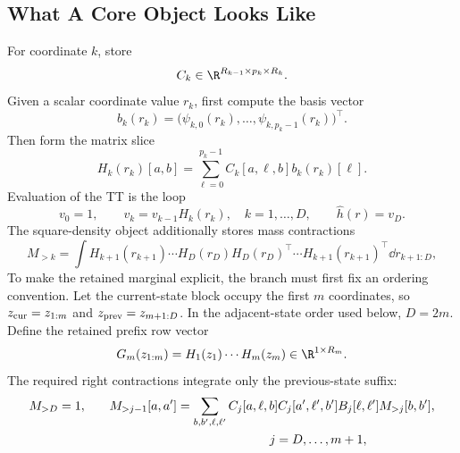 \subsection{What A Core Object Looks Like}
\label{sec:bf-hd-squared-tt-core-object}

For coordinate \(k\), store
\begin{equation}
  C_k\in\R^{R_{k-1}\times p_k\times R_k}.
  \label{eq:bf-hd-squared-tt-core-shape}
\end{equation}
Given a scalar coordinate value \(r_k\), first compute the basis vector
\begin{equation}
  b_k(r_k)=
  \bigl(\psi_{k,0}(r_k),\ldots,\psi_{k,p_k-1}(r_k)\bigr)^\top.
  \label{eq:bf-hd-squared-tt-basis-vector}
\end{equation}
Then form the matrix slice
\begin{equation}
  H_k(r_k)[a,b]
  =
  \sum_{\ell=0}^{p_k-1}C_k[a,\ell,b]b_k(r_k)[\ell].
  \label{eq:bf-hd-squared-tt-core-eval}
\end{equation}
Evaluation of the TT is the loop
\begin{equation}
  v_0=1,
  \qquad
  v_k=v_{k-1}H_k(r_k),\quad k=1,\ldots,D,
  \qquad
  \widehat h(r)=v_D.
  \label{eq:bf-hd-squared-tt-tt-eval}
\end{equation}
The square-density object additionally stores mass contractions
\begin{equation}
  M_{>k}
  =
  \int H_{k+1}(r_{k+1})\cdots H_D(r_D)
  H_D(r_D)^\top\cdots H_{k+1}(r_{k+1})^\top
  \dd r_{k+1:D},
  \label{eq:bf-hd-squared-tt-mass-contraction}
\end{equation}
To make the retained marginal explicit, the branch must first fix an ordering
convention.  Let the current-state block occupy the first \(m\) coordinates,
so \(z_{\rm cur}=z_{1:m}\) and \(z_{\rm prev}=z_{m+1:D}\).  In the adjacent-state
order used below, \(D=2m\).  Define the retained prefix row vector
\begin{equation}
  G_m(z_{1:m})=H_1(z_1)\cdots H_m(z_m)
  \in\R^{1\times R_m}.
  \label{eq:bf-hd-squared-tt-retained-prefix}
\end{equation}
The required right contractions integrate only the previous-state suffix:
\begin{equation}
\begin{aligned}
  M_{>D}=1,
  \qquad&
  M_{>j-1}[a,a']
  =
  \sum_{b,b',\ell,\ell'}
  C_j[a,\ell,b]
  C_j[a',\ell',b']
  B_j[\ell,\ell']
  M_{>j}[b,b'],\\
  &\hspace{45mm}j=D,\ldots,m+1,
\end{aligned}
  \label{eq:bf-hd-squared-tt-right-mass-recursion}
\end{equation}
